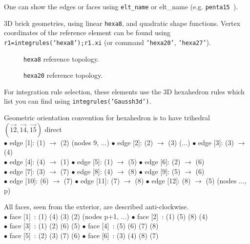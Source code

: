One can show the edges or faces using {\tt {\ti elt\_name}}  or {\ti elt\_name}  (e.g. {\tt penta15 }).


3D brick geometries, using linear {\tt hexa8}, and quadratic shape functions.  
Vertex coordinates of the reference element can be found using {\tt r1=integrules('hexa8');r1.xi} (or command {\tt 'hexa20'}, {\tt 'hexa27'}).

\begin{figure}[H]
\centering
{} %
 \nlvs\nlvs\nlvs\caption{{\tt hexa8} reference topology.}
\end{figure}

\begin{figure}[H]
\centering
{} %
 \nlvs\nlvs\nlvs\caption{{\tt hexa20} reference topology.}
\end{figure}

For integration rule selection, these elements use the 3D hexahedron rules which list you can find using {\tt integrules('Gaussh3d')}.

Geometric orientation convention for hexahedron is to have trihedral $(\vec{12},\vec{14},\vec{15}) $ direct \\
   $\bullet$ edge [1]: (1) $\rightarrow$ (2)  (nodes 9, ...) 
   $\bullet$ edge [2]: (2) $\rightarrow$ (3)  (...) 
   $\bullet$ edge [3]: (3) $\rightarrow$ (4)  \\
   $\bullet$ edge [4]: (4) $\rightarrow$ (1) 
   $\bullet$ edge [5]: (1) $\rightarrow$ (5) 
   $\bullet$ edge [6]: (2) $\rightarrow$ (6) \\
   $\bullet$ edge [7]: (3) $\rightarrow$ (7) 
   $\bullet$ edge [8]: (4) $\rightarrow$ (8) 
   $\bullet$ edge [9]: (5) $\rightarrow$ (6) \\
   $\bullet$ edge [10]: (6) $\rightarrow$ (7) 
   $\bullet$ edge [11]: (7) $\rightarrow$ (8) 
   $\bullet$ edge [12]: (8) $\rightarrow$ (5) (nodes ..., p)

   All faces, seen from the exterior, are described anti-clockwise. \\
   $\bullet$ face [1]~: (1) (4) (3) (2)  (nodes p+1, ...) 
   $\bullet$ face [2]~: (1) (5) (8) (4) \\  
   $\bullet$ face [3]~: (1) (2) (6) (5) 
   $\bullet$ face [4]~: (5) (6) (7) (8) \\
   $\bullet$ face [5]~: (2) (3) (7) (6) 
   $\bullet$ face [6]~: (3) (4) (8) (7)


